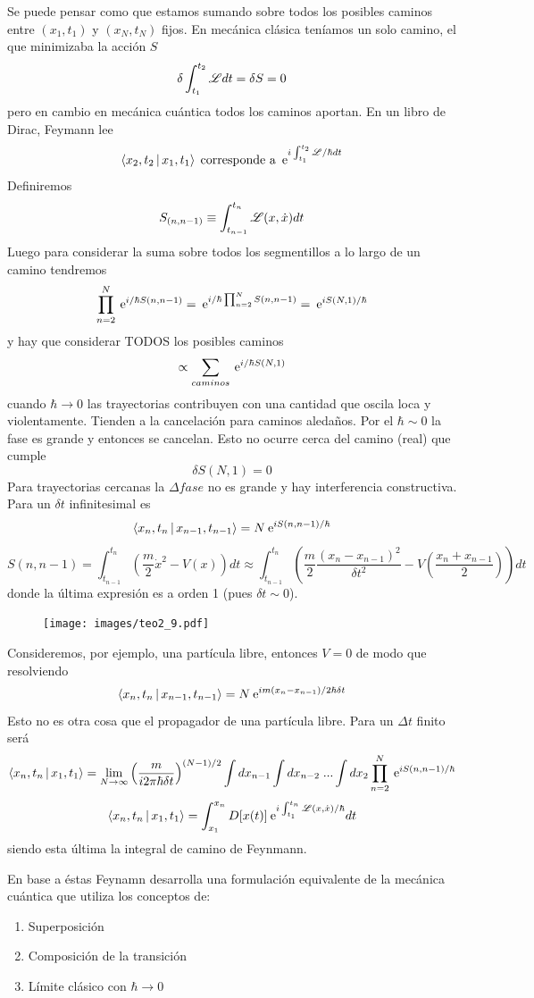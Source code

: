 \documentclass[10pt,oneside]{CBFT_book}
\begin{document}
Se puede pensar como que estamos sumando sobre todos los posibles caminos entre $(x_1,t_1)$ y $(x_N,t_N)$ 
fijos. En mecánica clásica teníamos un solo camino, el que minimizaba la acción $S$
\[
	\delta \int_{t_1}^{t_2} \mathscr{L} dt = \delta S = 0
\]
pero en cambio en mecánica cuántica todos los caminos aportan. En un libro de Dirac, Feymann lee 
\[
	\Braket{x_2,t_2|x_1,t_1} \; \text{corresponde a} \; \:\mathrm{e}^{i\int_{t_1}^{t_2}\mathscr{L}/\hbar dt}
\]
Definiremos
\[
	S_{(n,n-1)}\equiv \int_{t_{n-1}}^{t_n}\mathscr{L}(x,\dot{x}) dt
\]
Luego para considerar la suma sobre todos los segmentillos a lo largo de un camino tendremos
\[
	\prod_{n=2}^N \:\mathrm{e}^{i/\hbar S(n,n-1)} = \:\mathrm{e}^{i/\hbar \prod_{n=2}^N S(n,n-1)} = \:\mathrm{e}^{iS(N,1)/\hbar}
\]
y hay que considerar TODOS los posibles caminos 
\[
	\propto \sum_{caminos} \:\mathrm{e}^{i/\hbar S(N,1)} 
\]
cuando $\hbar \to 0$ las trayectorias contribuyen con una cantidad que oscila loca y violentamente. Tienden a 
la cancelación para caminos aledaños. Por el $\hbar \sim 0$ la fase es grande y entonces se cancelan.
Esto no ocurre cerca del camino (real) que cumple 
\[
	\delta S(N,1) = 0
\]
Para trayectorias cercanas la $\Delta fase$ no es grande y hay interferencia constructiva.
Para un $\delta t$ infinitesimal es 
\[
	\Braket{x_n,t_n|x_{n-1},t_{n-1}} = N \:\mathrm{e}^{iS(n,n-1)/\hbar}
\]
\[
	S(n,n-1) = \int_{t_{n-1}}^{t_n} \left( \frac{m}{2}\dot{x}^2 - V(x)\right) dt \approx
	\int_{t_{n-1}}^{t_n} \left( \frac{m}{2} \frac{(x_n-x_{n-1})^2}{\delta t^2} - 
	V\left(\frac{x_n+x_{n-1}}{2}\right)\right)  dt
\]
donde la última expresión es a orden 1 (pues $\delta t \sim 0$).
\begin{figure}[htb]
	\begin{center}
	\texttt{[image: images/teo2\_9.pdf]}
	\end{center}
	\caption{}
\end{figure} 

Consideremos, por ejemplo, una partícula libre, entonces $V=0$ de modo que resolviendo 
\[
	\Braket{x_n,t_n|x_{n-1},t_{n-1}} = N \:\mathrm{e}^{im(x_n - x_{n-1})/2\hbar\delta t}
\]
Esto no es otra cosa que el propagador de una partícula libre. Para un $\Delta t$ finito será 
\[
	\Braket{x_n,t_n|x_1,t_1}  = \lim_{N\to\infty} \left(\frac{m}{i2\pi\hbar\delta t}\right)^{(N-1)/2}
	\int dx_{n-1}\int dx_{n-2} \; ... \int dx_2 \prod_{n=2}^N \:\mathrm{e}^{i S(n,n-1)/\hbar}
\]
\[
	\Braket{x_n,t_n|x_1,t_1}  = \int_{x_1}^{x_n} D[x(t)] \:\mathrm{e}^{i \int _{t_1}^{t_n} \mathscr{L}(x,\dot{x})/\hbar} dt
\]
siendo esta última la integral de camino de Feynmann.

En base a éstas Feynamn desarrolla una formulación equivalente de la mecánica cuántica que utiliza los 
conceptos de:
\begin{enumerate}
 \item Superposición
 \item Composición de la transición
 \item Límite clásico con $\hbar \to 0$
\end{enumerate}
\end{document}
